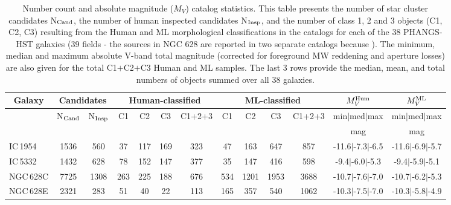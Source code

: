 %
\begin{table*}
\begin{center}
\caption{Number count and absolute magnitude ($M_V$) catalog statistics. This table presents the number of star cluster candidates N$_{\rm Cand}$, the number of human inspected candidates N$_{\rm Insp}$, and the number of class 1, 2 and 3 objects (C1, C2, C3) resulting from the Human and ML morphological classifications in the catalogs for each of the 38 PHANGS-HST galaxies (39 fields - the sources in NGC 628 are reported in two separate catalogs because  ). The minimum, median and maximum absolute V-band total magnitude (corrected for foreground MW reddening and aperture losses) are also given for the total C1$+$C2$+$C3 Human and ML samples. The last 3 rows provide the median, mean, and total numbers of objects summed over all 38 galaxies.}
\label{tab:numbers}
\begin{tabular}{lcccccccccccc}
\hline\hline
\multicolumn{1}{c}{Galaxy} & \multicolumn{2}{c}{Candidates} & \multicolumn{4}{c}{Human-classified} & \multicolumn{4}{c}{ML-classified} & \multicolumn{1}{c}{$M_V^{\rm Hum}$} & \multicolumn{1}{c}{$M_V^{\rm ML}$} \\ 
\hline
\multicolumn{1}{c}{} & \multicolumn{1}{c}{N$_{\rm Cand}$} & \multicolumn{1}{c}{N$_{\rm Insp}$} & \multicolumn{1}{c}{C1} & \multicolumn{1}{c}{C2} & \multicolumn{1}{c}{C3} & \multicolumn{1}{c}{C1+2+3} & \multicolumn{1}{c}{C1} & \multicolumn{1}{c}{C2} & \multicolumn{1}{c}{C3} & \multicolumn{1}{c}{C1+2+3} & \multicolumn{1}{c}{min$\vert$med$\vert$max} & \multicolumn{1}{c}{min$\vert$med$\vert$max} \\ 
\hline
\multicolumn{1}{c}{} & \multicolumn{1}{c}{} & \multicolumn{1}{c}{} & \multicolumn{4}{c}{} & \multicolumn{4}{c}{} & \multicolumn{1}{c}{mag} & \multicolumn{1}{c}{mag} \\ 
\hline
IC\,1954 & 1536 & 560 & 37 & 117 & 169 & 323 & 47 & 163 & 647 & 857 & -11.6$\vert$-7.3$\vert$-6.5 & -11.6$\vert$-6.9$\vert$-5.7 \\ 
IC\,5332 & 1432 & 628 & 78 & 152 & 147 & 377 & 35 & 147 & 416 & 598 & -9.4$\vert$-6.0$\vert$-5.3 & -9.4$\vert$-5.9$\vert$-5.1 \\ 
NGC\,628C & 7725 & 1308 & 263 & 225 & 188 & 676 & 534 & 1201 & 1953 & 3688 & -10.7$\vert$-7.6$\vert$-7.0 & -10.7$\vert$-6.2$\vert$-5.3 \\ 
NGC\,628E & 2321 & 283 & 51 & 40 & 22 & 113 & 165 & 357 & 540 & 1062 & -10.3$\vert$-7.5$\vert$-7.0 & -10.3$\vert$-5.8$\vert$-4.9 \\ 

\end{tabular}
\end{center}
\end{table*}
